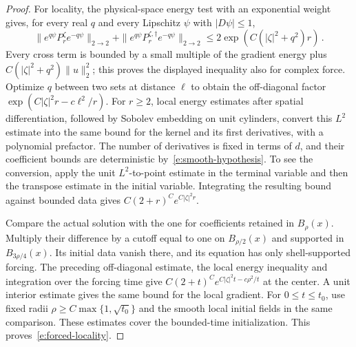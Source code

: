 \documentclass[11pt]{amsart}
\theoremstyle{definition}
\theoremstyle{remark}
\numberwithin{equation}{section}
\begin{document}
\begin{proof}
For locality, the physical-space energy test with an exponential weight gives, for every real $q$ and every Lipschitz $\psi$ with $|D\psi|\leq1$,
\begin{equation*}
 \|e^{q\psi}P_r^\zeta e^{-q\psi}\|_{2\to2}
 +\|e^{q\psi}P_r^{\zeta,\dagger}e^{-q\psi}\|_{2\to2}
 \leq2\exp(C(|\zeta|^2+q^2)r)\, .
\end{equation*}
Every cross term is bounded by a small multiple of the gradient energy plus $C(|\zeta|^2+q^2)\|u\|_2^2$; this proves the displayed inequality also for complex force. Optimize $q$ between two sets at distance $\ell$ to obtain the off-diagonal factor $\exp(C|\zeta|^2r-c\ell^2/r)$. For $r\geq2$, local energy estimates after spatial differentiation, followed by Sobolev embedding on unit cylinders, convert this $L^2$ estimate into the same bound for the kernel and its first derivatives, with a polynomial prefactor. The number of derivatives is fixed in terms of $d$, and their coefficient bounds are deterministic by~\eqref{e:smooth-hypothesis}. To see the conversion, apply the unit $L^2$-to-point estimate in the terminal variable and then the transpose estimate in the initial variable. Integrating the resulting bound against bounded data gives $C(2+r)^C e^{C|\zeta|^2r}$.

Compare the actual solution with the one for coefficients retained in $B_\rho(x)$. Multiply their difference by a cutoff equal to one on $B_{\rho/2}(x)$ and supported in $B_{3\rho/4}(x)$. Its initial data vanish there, and its equation has only shell-supported forcing. The preceding off-diagonal estimate, the local energy inequality and integration over the forcing time give $C(2+t)^C e^{C|\zeta|^2t-c\rho^2/t}$ at the center. A unit interior estimate gives the same bound for the local gradient. For $0\leq t\leq t_0$, use fixed radii $\rho\geq C\max\{1,\sqrt{t_0}\}$ and the smooth local initial fields in the same comparison. These estimates cover the bounded-time initialization. This proves~\eqref{e:forced-locality}.
\end{proof}
\end{document}
